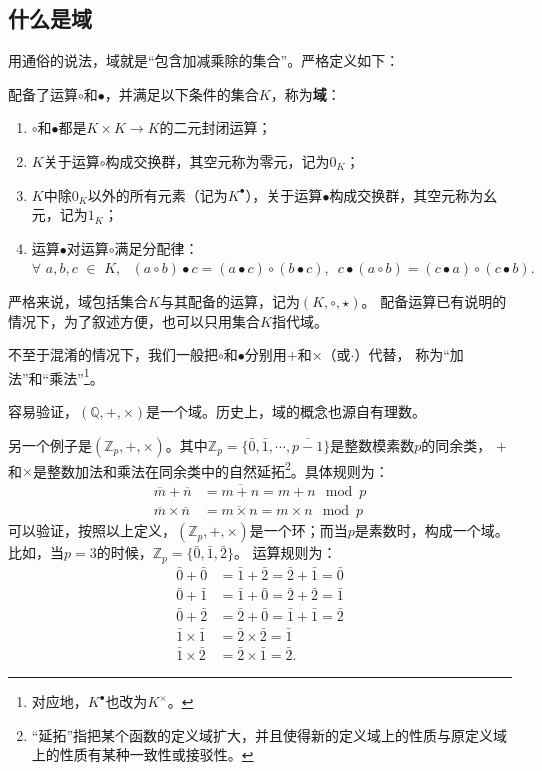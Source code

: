 \documentclass[12pt,UTF8,fontset=none]{ctexbook}
\begin{document}
\begin{appendix}
\subsection{什么是域}
用通俗的说法，域就是“包含加减乘除的集合”。严格定义如下：
\begin{df}\label{df:9_1}
    配备了运算$\circ$和$\bullet$，并满足以下条件的集合$K$，称为\textbf{域}：
    \begin{enumerate}
        \item $\circ$和$\bullet$都是$K \times K \rightarrow K$的二元封闭运算；
        \item $K$关于运算$\circ$构成交换群，其空元称为零元，记为$0_{K}$；
        \item $K$中除$0_{K}$以外的所有元素（记为$K^\bullet$），关于运算$\bullet$构成交换群，其空元称为幺元，记为$1_{K}$；
        \item 运算$\bullet$对运算$\circ$满足分配律：$\forall \,\, a, b, c \,\, \in \,\, K, \,\,\,\, (a \circ b) \bullet c = (a \bullet c) \circ (b \bullet c), \,\,\, c\bullet (a \circ b) = (c \bullet a) \circ (c \bullet b).$
    \end{enumerate}
    严格来说，域包括集合$K$与其配备的运算，记为$(K, \circ, \star)$。
    配备运算已有说明的情况下，为了叙述方便，也可以只用集合$K$指代域。
\end{df}
不至于混淆的情况下，我们一般把$\circ$和$\bullet$分别用$+$和$\times$（或$\cdot$）代替，
称为“加法”和“乘法”\footnote{对应地，$K^\bullet$也改为$K^\times$。}。

容易验证，$(\mathbb{Q}, +, \times)$是一个域。历史上，域的概念也源自有理数。

另一个例子是$(\mathbb{Z}_p, +, \times)$。其中$\mathbb{Z}_p = \{\bar{0}, \bar{1}, \cdots , \overline{p-1}\}$是整数模素数$p$的同余类，
$+$和$\times$是整数加法和乘法在同余类中的自然延拓\footnote{“延拓”指把某个函数的定义域扩大，并且使得新的定义域上的性质与原定义域上的性质有某种一致性或接驳性。}。具体规则为：
\begin{align*}
    \overline{m} + \overline{n} &= \overline{m+n} = m+n \mod{p}  \\
    \overline{m} \times \overline{n} &= \overline{m\times n} = m\times n \mod{p} 
\end{align*}
可以验证，按照以上定义，$(\mathbb{Z}_p, +, \times)$是一个环；而当$p$是素数时，构成一个域。
比如，当$p = 3$的时候，$\mathbb{Z}_p = \{\bar{0}, \bar{1}, \bar{2}\}$。
运算规则为：
\begin{align*}
    \bar{0} + \bar{0} &= \bar{1} + \bar{2} = \bar{2} + \bar{1}= \bar{0}  \\
    \bar{0} + \bar{1} &= \bar{1} + \bar{0} = \bar{2} + \bar{2}= \bar{1}  \\
    \bar{0} + \bar{2} &= \bar{2} + \bar{0} = \bar{1} + \bar{1}= \bar{2}  \\
    \bar{1} \times \bar{1} &= \bar{2} \times \bar{2} = \bar{1}  \\
    \bar{1} \times \bar{2} &= \bar{2} \times \bar{1} = \bar{2}.  
\end{align*}


\end{appendix}
\end{document}
